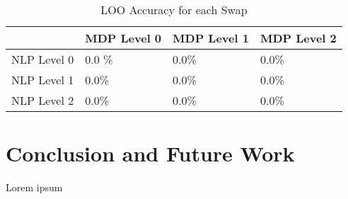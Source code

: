 \documentclass[conference]{IEEEtran}
\begin{document}
\begin{table}[h!]
\centering
\caption{LOO Accuracy for each Swap}
\label{my-label}
\begin{tabular}{l|l|l|l|}
\cline{2-4}
                                  & MDP Level 0 & MDP Level 1 & MDP Level 2 \\ \hline
\multicolumn{1}{|l|}{NLP Level 0} & 0.0 \%      & 0.0\%       & 0.0\%       \\ \hline
\multicolumn{1}{|l|}{NLP Level 1} & 0.0\%       & 0.0\%       & 0.0\%       \\ \hline
\multicolumn{1}{|l|}{NLP Level 2} & 0.0\%       & 0.0\%       & 0.0\%       \\ \hline
\end{tabular}
\end{table}

\section{Conclusion and Future Work}
\label{sec:conclusion}

Lorem ipsum





\end{document}
